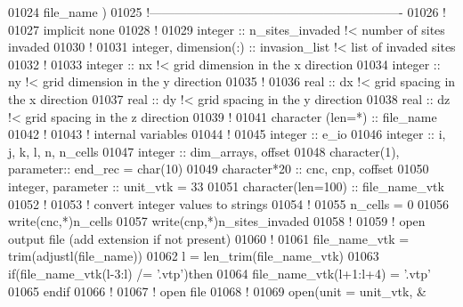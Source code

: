 \begin{DoxyCode}
01024                                             file\_name        )        
01025 \textcolor{comment}{!-------------------------------------------------------------}
01026 \textcolor{comment}{!}
01027 \textcolor{keyword}{implicit none}
01028 \textcolor{comment}{!}
01029 \textcolor{keywordtype}{integer} :: n\_sites\_invaded \textcolor{comment}{!< number of sites invaded}
01030 \textcolor{comment}{!}
01031 \textcolor{keywordtype}{integer}, \textcolor{keywordtype}{dimension(:)} :: invasion\_list \textcolor{comment}{!< list of invaded sites}
01032 \textcolor{comment}{!}
01033 \textcolor{keywordtype}{integer} :: nx \textcolor{comment}{!< grid dimension in the x direction}
01034 \textcolor{keywordtype}{integer} :: ny \textcolor{comment}{!< grid dimension in the y direction }
01035 \textcolor{comment}{!}
01036 \textcolor{keywordtype}{real} :: dx \textcolor{comment}{!< grid spacing in the x direction}
01037 \textcolor{keywordtype}{real} :: dy \textcolor{comment}{!< grid spacing in the y direction }
01038 \textcolor{keywordtype}{real} :: dz \textcolor{comment}{!< grid spacing in the z direction}
01039 \textcolor{comment}{!}
01041 \textcolor{keywordtype}{character (len=*)} :: file\_name 
01042 \textcolor{comment}{!}
01043 \textcolor{comment}{! internal variables}
01044 \textcolor{comment}{!}
01045 \textcolor{keywordtype}{integer} :: e\_io
01046 \textcolor{keywordtype}{integer} :: i, j, k, l, n, n\_cells
01047 \textcolor{keywordtype}{integer} :: dim\_arrays, offset
01048 \textcolor{keywordtype}{character(1)}, \textcolor{keywordtype}{parameter}:: end\_rec = char(10)
01049 \textcolor{keywordtype}{character*20} :: cnc, cnp, coffset
01050 \textcolor{keywordtype}{integer}, \textcolor{keywordtype}{parameter} :: unit\_vtk = 33
01051 \textcolor{keywordtype}{character(len=100)} :: file\_name\_vtk
01052 \textcolor{comment}{!}
01053 \textcolor{comment}{! convert integer values to strings}
01054 \textcolor{comment}{!}
01055 n\_cells = 0
01056 \textcolor{keyword}{write}(cnc,*)n\_cells
01057 \textcolor{keyword}{write}(cnp,*)n\_sites\_invaded
01058 \textcolor{comment}{!}
01059 \textcolor{comment}{! open output file (add extension if not present)}
01060 \textcolor{comment}{!}
01061 file\_name\_vtk = trim(adjustl(file\_name))
01062 l = len\_trim(file\_name\_vtk)
01063 \textcolor{keyword}{if}(file\_name\_vtk(l-3:l) /= \textcolor{stringliteral}{'.vtp'})\textcolor{keyword}{then}
01064    file\_name\_vtk(l+1:l+4) = \textcolor{stringliteral}{'.vtp'}
01065 \textcolor{keyword}{endif}
01066 \textcolor{comment}{!}
01067 \textcolor{comment}{! open file}
01068 \textcolor{comment}{!}
01069 \textcolor{keyword}{open}(unit       = unit\_vtk,                     &

\end{DoxyCode}
